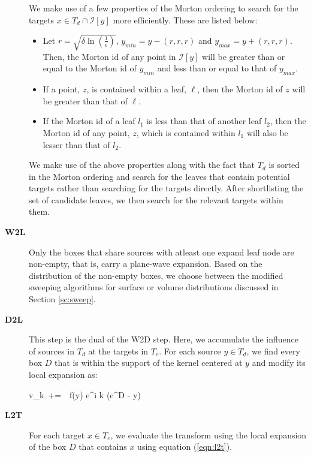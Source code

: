 \begin{description}
We make use of a few properties of the Morton ordering to search for the targets $x \in T_d \cap \mathcal{I}[y]$ more efficiently. These
are listed below:
\begin{itemize}
\item Let $r = \sqrt{\delta \ln (\frac{1}{\epsilon})}$, $y_{min} = y - (r, r, r)$ and $y_{max} = y + (r, r, r)$. Then, the Morton id of any point in $\mathcal{I}[y]$ will be greater than or equal to the Morton id of $y_{min}$ and less than or equal to that of $y_{max}$.
\item If a point, $z$, is contained within a leaf, $\ell$, then the Morton id of $z$ will be greater than that of $\ell$.
\item If the Morton id of a leaf $l_1$ is less than that of another leaf $l_2$, then the Morton id of any point, $z$, which is
 contained within $l_1$ will also be lesser than that of $l_2$.
\end{itemize}

 We make use of the above properties along with the fact that $T_d$ is sorted in the Morton ordering and
 search for the leaves that contain potential targets rather than searching for the targets directly. After
 shortlisting the set of candidate leaves, we then search for the relevant targets within them.

\item[\textbf{W2L}] Only the boxes that share sources with atleast one expand leaf node are non-empty, that is,
 carry a plane-wave expansion. Based on the distribution of the non-empty boxes, we choose between the modified sweeping
 algorithms for surface or volume distributions discussed in Section \ref{sc:sweep}. 

\item[\textbf{D2L}] This step is the dual of the W2D step. Here, we accumulate the influence of sources in $T_d$ at the targets in $T_e$. For each source $y \in T_d$, we find every box $D$ that is within the support of the kernel centered at $y$ and
modify its local expansion as: 

\beq v_k  \,+=\, \, f(y) e^{i \lambda k \cdot (c^D - y)} \label{eqn:d2l} \eeq

\item[\textbf{L2T}] For each target $x \in T_e$, we evaluate the transform using the local 
expansion of the box $D$ that contains $x$ using equation (\ref{eqn:l2t}).
\end{description}



